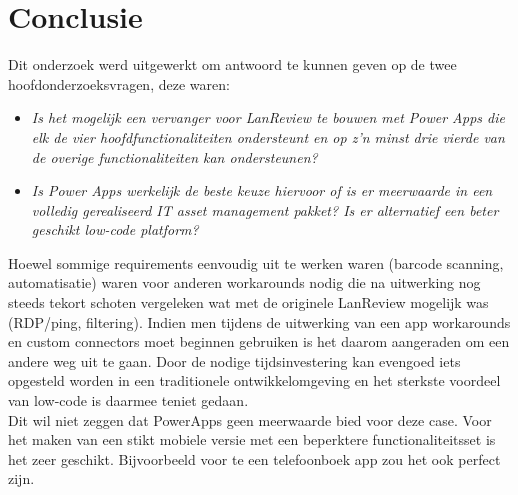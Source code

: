 
\chapter{Conclusie}
\label{ch:conclusie}


Dit onderzoek werd uitgewerkt om antwoord te kunnen geven op de twee hoofdonderzoeksvragen, deze waren:
\begin{itemize}
    \item \textit{Is het mogelijk een vervanger voor LanReview te bouwen met Power Apps die elk de vier hoofdfunctionaliteiten ondersteunt en op z'n minst drie vierde van de overige functionaliteiten kan ondersteunen?}
    \item \textit{Is Power Apps werkelijk de beste keuze hiervoor of is er meerwaarde in een volledig gerealiseerd IT asset management pakket? Is er alternatief een beter geschikt low-code platform?}
\end{itemize}

Hoewel sommige requirements eenvoudig uit te werken waren (barcode scanning, automatisatie) waren voor anderen workarounds nodig die na uitwerking nog steeds tekort schoten vergeleken wat met de originele LanReview mogelijk was (RDP/ping, filtering). Indien men tijdens de uitwerking van een app workarounds en custom connectors moet beginnen gebruiken is het daarom aangeraden om een andere weg uit te gaan. Door de nodige tijdsinvestering kan evengoed iets opgesteld worden in een traditionele ontwikkelomgeving en het sterkste voordeel van low-code is daarmee teniet gedaan.\\
Dit wil niet zeggen dat PowerApps geen meerwaarde bied voor deze case. Voor het maken van een stikt mobiele versie met een beperktere functionaliteitsset is het zeer geschikt. Bijvoorbeeld voor te een telefoonboek app zou het ook perfect zijn.

